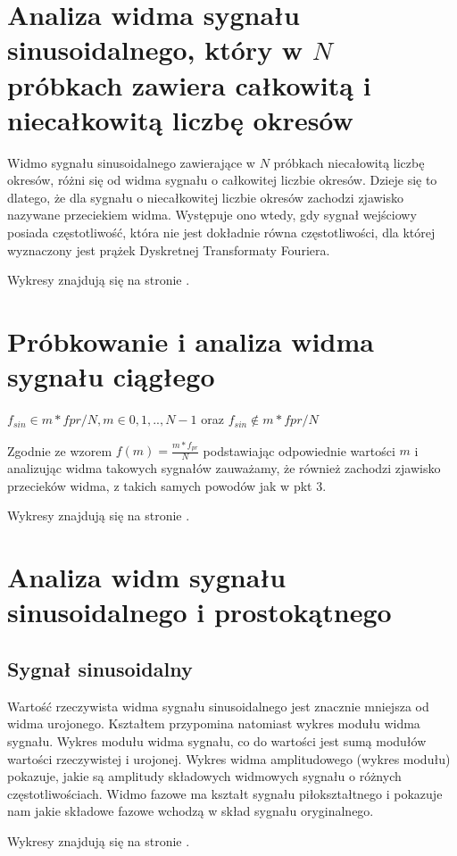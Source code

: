 \documentclass[wide,a4paper,titlepage,12pt]{mwart}
\begin{document}
  
  \section{Analiza widma sygnału sinusoidalnego, który w $N$ próbkach zawiera całkowitą i niecałkowitą liczbę okresów}
		Widmo sygnału sinusoidalnego zawierające w $N$ próbkach niecałowitą liczbę okresów, różni się od widma sygnału o całkowitej liczbie okresów. Dzieje się to dlatego, że dla sygnału o niecałkowitej liczbie okresów zachodzi zjawisko nazywane przeciekiem widma. Występuje ono wtedy, gdy sygnał wejściowy posiada częstotliwość, która nie jest dokładnie równa częstotliwości, dla której wyznaczony jest prążek Dyskretnej Transformaty Fouriera.
		
		Wykresy znajdują się na stronie \pageref{fig1}.

  \section{Próbkowanie i analiza widma sygnału ciągłego}
		{$f_{sin} \in m*fpr/N, m \in {0,1,..,N-1}$} oraz {$f_{sin} \notin m*fpr/N$}
		
		Zgodnie ze wzorem $f(m) = \frac{m*f_{pr}}{N}$ podstawiając odpowiednie wartości $m$ i analizując widma takowych sygnałów zauważamy, że również zachodzi zjawisko przecieków widma, z takich samych powodów jak w pkt 3.
		
		Wykresy znajdują się na stronie \pageref{fig2}.
		
	\section{Analiza widm sygnału sinusoidalnego i prostokątnego}
		\subsection{Sygnał sinusoidalny}
		Wartość rzeczywista widma sygnału sinusoidalnego jest znacznie mniejsza od widma urojonego. Kształtem przypomina natomiast wykres modułu widma sygnału. Wykres modułu widma sygnału, co do wartości jest sumą modułów wartości rzeczywistej i urojonej. Wykres widma amplitudowego (wykres modułu) pokazuje, jakie są amplitudy składowych widmowych sygnału o różnych częstotliwościach. Widmo fazowe ma kształt sygnału piłokształtnego i pokazuje nam jakie składowe fazowe wchodzą w skład sygnału oryginalnego.
		
		Wykresy znajdują się na stronie \pageref{fig3}.
		
\end{document}
